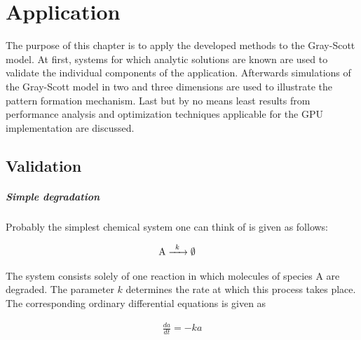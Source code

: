 \chapter{Application} %
\label{ch:4}

The purpose of this chapter is to apply the developed methods to the Gray-Scott model. At first, systems for which analytic solutions are known are used to validate the individual components of the application. Afterwards simulations of the Gray-Scott model in two and three dimensions are used to illustrate the pattern formation mechanism. Last but by no means least results from performance analysis and optimization techniques applicable for the GPU implementation are discussed. 

\section{Validation}
\label{ch:validation}
\paragraph{Simple degradation} Probably the simplest chemical system one can think of is given as follows:

\begin{align}
\cee{A &->[k] \emptyset{}}
\label{eq:simpledeg}
\end{align}

The system consists solely of one reaction in which molecules of species A are degraded. The parameter $k$ determines the rate at which this process takes place. The corresponding ordinary differential equations is given as

\begin{align}
\frac{da}{dt} = - ka
\label{eq:deg_analytic}
\end{align}

